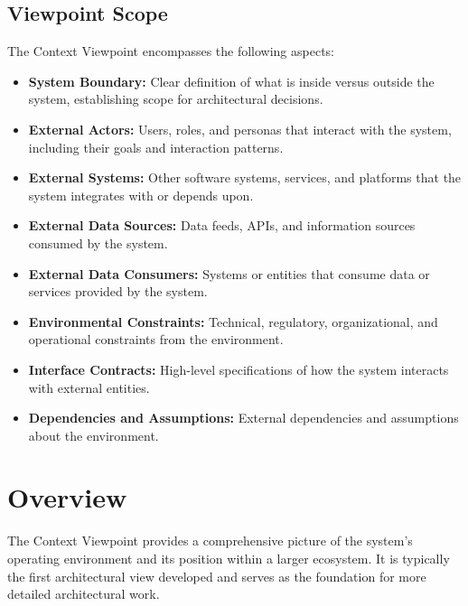 \documentclass[11pt,letterpaper]{article}
\begin{document}
\subsection{Viewpoint Scope}

The Context Viewpoint encompasses the following aspects:

\begin{itemize}
    \item \textbf{System Boundary:} Clear definition of what is inside versus outside the system, establishing scope for architectural decisions.
    
    \item \textbf{External Actors:} Users, roles, and personas that interact with the system, including their goals and interaction patterns.
    
    \item \textbf{External Systems:} Other software systems, services, and platforms that the system integrates with or depends upon.
    
    \item \textbf{External Data Sources:} Data feeds, APIs, and information sources consumed by the system.
    
    \item \textbf{External Data Consumers:} Systems or entities that consume data or services provided by the system.
    
    \item \textbf{Environmental Constraints:} Technical, regulatory, organizational, and operational constraints from the environment.
    
    \item \textbf{Interface Contracts:} High-level specifications of how the system interacts with external entities.
    
    \item \textbf{Dependencies and Assumptions:} External dependencies and assumptions about the environment.
\end{itemize}

\section{Overview}

The Context Viewpoint provides a comprehensive picture of the system's operating environment and its position within a larger ecosystem. It is typically the first architectural view developed and serves as the foundation for more detailed architectural work.
\end{document}

